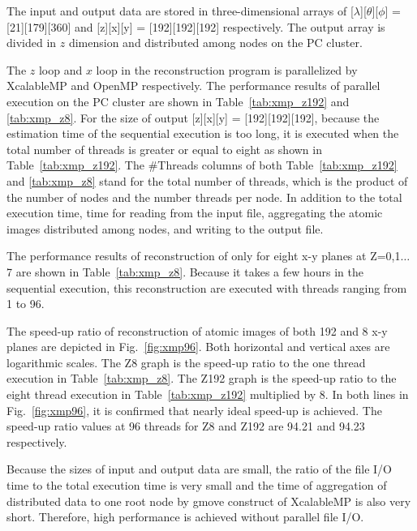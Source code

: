 \documentclass[graybox,vecphys]{svmult}
\begin{document}
The input and output data are stored in three-dimensional arrays of
[$\lambda$][$\theta$][$\phi$] = [21][179][360] and [z][x][y] =
[192][192][192] respectively. The output array is divided in $z$ dimension
and distributed among nodes on the PC cluster.

The $z$ loop and $x$ loop in the reconstruction program is
parallelized by XcalableMP and OpenMP respectively. The performance
results of parallel execution on the PC cluster are shown in Table~\ref{tab:xmp_z192} and \ref{tab:xmp_z8}.
For the size of output [z][x][y] = [192][192][192],
because the estimation time of the sequential execution is too long,
it is executed when the total number of threads is greater or equal to eight
as shown in Table~\ref{tab:xmp_z192}.
The \#Threads columns of both Table~\ref{tab:xmp_z192} and \ref{tab:xmp_z8}
stand for the total number of threads, which is the product of the number
of nodes and the number threads per node. In addition to the total execution
time, time for reading from the input file, aggregating the atomic images
distributed among nodes, and writing to the output file.

The performance results of reconstruction of only for eight x-y planes
at Z=0,1$\ldots$7 are shown in Table~\ref{tab:xmp_z8}. Because it
takes a few hours in the sequential execution, this reconstruction are
executed with threads ranging from 1 to 96.

The speed-up ratio of reconstruction of atomic images of both 192 and
8 x-y planes are depicted in Fig.~\ref{fig:xmp96}. Both horizontal and
vertical axes are logarithmic scales. The Z8 graph is the speed-up
ratio to the one thread execution in Table~\ref{tab:xmp_z8}. The Z192
graph is the speed-up ratio to the eight thread execution in
Table~\ref{tab:xmp_z192} multiplied by 8. In both lines in
Fig.~\ref{fig:xmp96}, it is confirmed that nearly ideal speed-up is
achieved. The speed-up ratio values at 96 threads for Z8 and Z192 are
94.21 and 94.23 respectively.

Because the sizes of input and output data are small, the ratio of the
file I/O time to the total execution time is very small and the time of
aggregation of distributed data to one root node by gmove construct of
XcalableMP is also very short. Therefore, high performance is achieved
without parallel file I/O.
\end{document}

